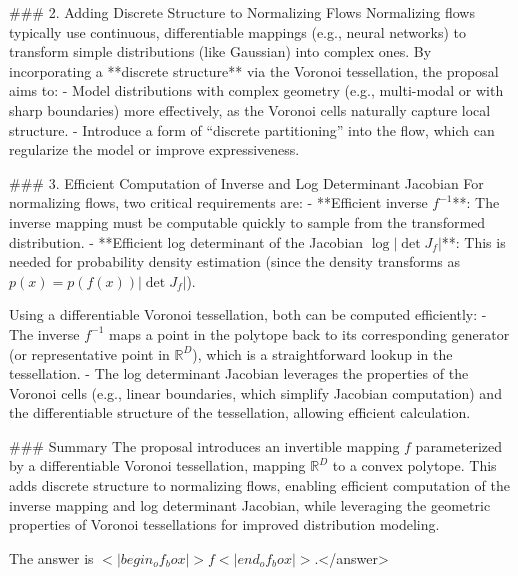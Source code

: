 ### 2. Adding Discrete Structure to Normalizing Flows  
Normalizing flows typically use continuous, differentiable mappings (e.g., neural networks) to transform simple distributions (like Gaussian) into complex ones. By incorporating a **discrete structure** via the Voronoi tessellation, the proposal aims to:  
- Model distributions with complex geometry (e.g., multi-modal or with sharp boundaries) more effectively, as the Voronoi cells naturally capture local structure.  
- Introduce a form of “discrete partitioning” into the flow, which can regularize the model or improve expressiveness.  


### 3. Efficient Computation of Inverse and Log Determinant Jacobian  
For normalizing flows, two critical requirements are:  
- **Efficient inverse \( f^{-1} \)**: The inverse mapping must be computable quickly to sample from the transformed distribution.  
- **Efficient log determinant of the Jacobian \( \log | \det J_f | \)**: This is needed for probability density estimation (since the density transforms as \( p(x) = p(f(x)) | \det J_f | \)).  

Using a differentiable Voronoi tessellation, both can be computed efficiently:  
- The inverse \( f^{-1} \) maps a point in the polytope back to its corresponding generator (or representative point in \( \mathbb{R}^D \)), which is a straightforward lookup in the tessellation.  
- The log determinant Jacobian leverages the properties of the Voronoi cells (e.g., linear boundaries, which simplify Jacobian computation) and the differentiable structure of the tessellation, allowing efficient calculation.  


### Summary  
The proposal introduces an invertible mapping \( f \) parameterized by a differentiable Voronoi tessellation, mapping \( \mathbb{R}^D \) to a convex polytope. This adds discrete structure to normalizing flows, enabling efficient computation of the inverse mapping and log determinant Jacobian, while leveraging the geometric properties of Voronoi tessellations for improved distribution modeling.  

The answer is \(<|begin_of_box|>f<|end_of_box|>\).</answer>